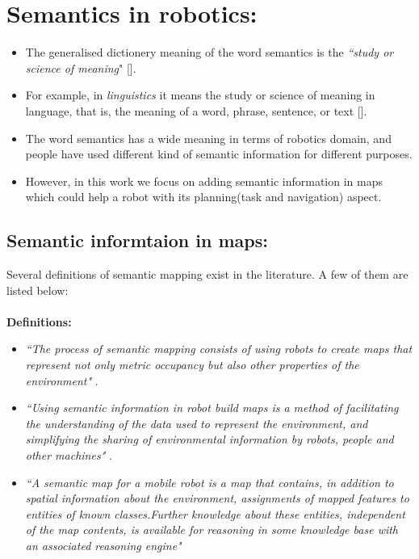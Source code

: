 \section{Semantics in robotics:}
\begin{itemize}[noitemsep,nolistsep]
 \item The generalised dictionery meaning of the word semantics is the \textit{``study or science of meaning}" [].
 \item For example, in \textit{linguistics} it means the study or science of meaning in language, that is, the meaning of a word, 
 phrase, sentence, or text [].
 \item The word semantics has a wide meaning in terms of robotics domain, and people have used different kind of semantic information 
 for different purposes.
 \item However, in this work we focus on adding semantic information in maps which could help a robot with its planning(task and navigation) aspect. 
\end{itemize}


\subsection{Semantic informtaion in maps:}
Several definitions of semantic mapping exist in the literature. A few of them are listed below:\\\\
\textbf{Definitions:}
\begin{itemize}[noitemsep,nolistsep]
 \item \textit{``The process of semantic mapping consists of using robots to create maps that represent not only metric occupancy but also other properties of the environment"} \cite{11}.
 \item \textit{``Using semantic information in robot build maps is a method of facilitating the understanding of the data used to represent the environment, and simplifying the sharing 
 of environmental information by robots, people and other machines"} \cite{11}.
 \item \textit{``A semantic map for a mobile robot is a map that contains, in addition to spatial information about the environment,
assignments of mapped features to entities of known classes.Further knowledge about these entities, independent of the
map contents, is available for reasoning in some knowledge base with an associated reasoning engine"} \cite{5}\\\\
\end{itemize}


